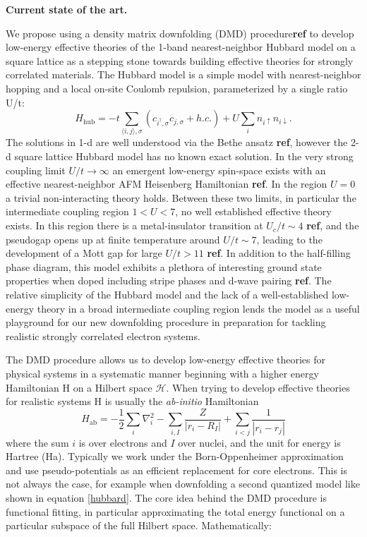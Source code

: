 \documentclass{article}
\begin{document}
\textbf{Current state of the art.}

We propose using a density matrix downfolding (DMD) procedure\textbf{ref} to develop low-energy effective theories of the 1-band nearest-neighbor Hubbard model on a square lattice as a stepping stone towards building effective theories for strongly correlated materials. The Hubbard model is a simple model with nearest-neighbor hopping and a local on-site Coulomb repulsion, parameterized by a single ratio U/t: 
\begin{equation}
H_\text{hub} = -t \sum_{\langle i,j \rangle,\sigma}( c_{i^\dagger,\sigma} c_{j,\sigma} + h.c.) + U \sum_i n_{i\uparrow} n_{i\downarrow}
\label{hubbard}.
\end{equation}
The solutions in 1-d are well understood via the Bethe ansatz \textbf{ref}, however the 2-d square lattice Hubbard model has no known exact solution.  In the very strong coupling limit $U/t \rightarrow \infty$ an emergent low-energy spin-space exists with an effective nearest-neighbor AFM Heisenberg Hamiltonian \textbf{ref}. In the region $U = 0$ a trivial non-interacting theory holds. Between these two limits, in particular the intermediate coupling region $1 < U < 7$, no well established effective theory exists. In this region there is a metal-insulator transition at $U_c/t \sim 4$ \textbf{ref}, and the pseudogap opens up at finite temperature around $U/t \sim 7$, leading to the development of a Mott gap for large $U/t > 11$ \textbf{ref}. In addition to the half-filling phase diagram, this model exhibits a plethora of interesting ground state properties when doped including stripe phases and d-wave pairing \textbf{ref}. The relative simplicity of the Hubbard model and the lack of a well-established low-energy theory in a broad intermediate coupling region lends the model as a useful playground for our new downfolding procedure in preparation for tackling realistic strongly correlated electron systems. 

The DMD procedure allows us to develop low-energy effective theories
for physical systems in a systematic manner beginning with a higher energy Hamiltonian H on a Hilbert space $\mathcal{H}$. When trying to develop effective theories for realistic systems H is usually the \textit{ab-initio} Hamiltonian
\begin{equation}
H_\text{ab} = -\frac{1}{2} \sum_{i} \nabla_i^2 - \sum_{i,I}\frac{Z}{|r_i - R_I|} + \sum_{i<j}\frac{1}{|r_i - r_j|} 
\label{ab}
\end{equation} 
where the sum $i$ is over electrons and $I$ over nuclei, and the unit for energy is Hartree (Ha). Typically we work under the Born-Oppenheimer approximation and use pseudo-potentials as an efficient replacement for core electrons. This is not always the case, for example when downfolding a second quantized model like shown in equation \ref{hubbard}. The core idea behind the DMD procedure is functional fitting, in particular approximating the total energy functional on a particular subspace of the full Hilbert space. Mathematically:
\end{document}
